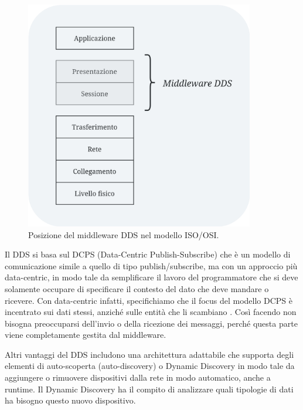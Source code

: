 \begin{figure}[H]
    \centering
    \includegraphics[width=10cm, keepaspectratio]{img/ModelloISOOSIDDS-Pagina-3.jpg}
    \caption{Posizione del middleware DDS nel modello ISO/OSI.}
    \label{DDSISOOSI}
\end{figure}


Il DDS si basa sul DCPS (Data-Centric Publish-Subscribe) 
che è un modello di comunicazione simile a quello
di tipo publish/subscribe, ma con un approccio più data-centric, in modo
tale da semplificare il lavoro del programmatore che si deve solamente
occupare di specificare il contesto del dato che deve mandare o ricevere.
Con data-centric infatti, specifichiamo che il focus del modello DCPS 
è incentrato 
sui dati stessi, anziché sulle entità che li scambiano \cite{whatisdds}.
Così facendo non bisogna preoccuparsi dell'invio o della ricezione
dei messaggi, perché questa parte viene completamente gestita dal middleware.


Altri vantaggi del DDS includono una architettura adattabile che supporta
degli elementi di auto-scoperta (auto-discovery) o Dynamic Discovery 
in modo tale da aggiungere o 
rimuovere dispositivi dalla rete in modo automatico, anche a runtime.
Il Dynamic Discovery ha il compito di analizzare quali tipologie di dati 
ha bisogno questo nuovo dispositivo. 

